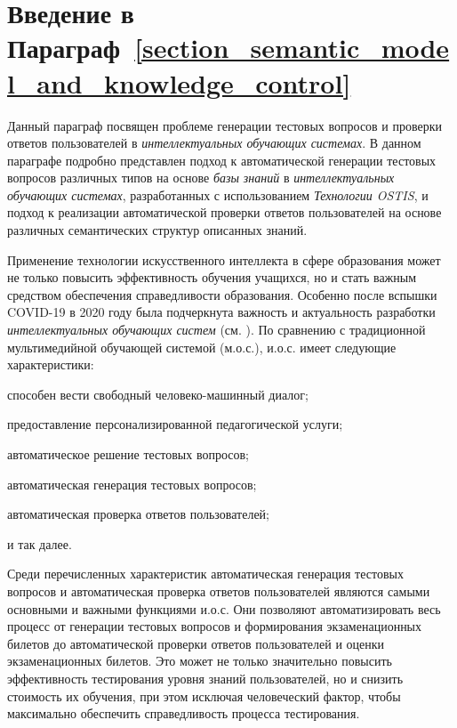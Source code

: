 \section*{Введение в Параграф~\ref{section_semantic_model_and_knowledge_control}}
Данный параграф посвящен проблеме генерации тестовых вопросов и проверки ответов пользователей в \textit{интеллектуальных обучающих системах}. В данном параграфе подробно представлен подход к автоматической генерации тестовых вопросов различных типов на основе \textit{базы знаний} в \textit{интеллектуальных обучающих системах}, разработанных с использованием \textit{Технологии OSTIS}, и подход к реализации автоматической проверки ответов пользователей на основе различных семантических структур описанных знаний.

Применение технологии искусственного интеллекта в сфере образования может не только повысить эффективность обучения учащихся, но и стать важным средством обеспечения справедливости образования. Особенно после вспышки COVID-19 в 2020 году была подчеркнута важность и актуальность разработки \textit{интеллектуальных обучающих систем} (см. ). По сравнению с традиционной мультимедийной обучающей системой (м.о.с.), и.о.с. имеет следующие характеристики:

\begin{textitemize}
	\item способен вести свободный человеко-машинный диалог;
	\item предоставление персонализированной педагогической услуги;
	\item автоматическое решение тестовых вопросов;
	\item автоматическая генерация тестовых вопросов;
	\item автоматическая проверка ответов пользователей;
	\item и так далее.
\end{textitemize}

Среди перечисленных характеристик автоматическая генерация тестовых вопросов и автоматическая проверка ответов пользователей являются самыми основными и важными функциями и.о.с. Они позволяют автоматизировать весь процесс от генерации тестовых вопросов и формирования экзаменационных билетов до автоматической проверки ответов пользователей и оценки экзаменационных билетов. Это может не только значительно повысить эффективность тестирования уровня знаний пользователей, но и снизить стоимость их обучения, при этом исключая человеческий фактор, чтобы максимально обеспечить справедливость процесса тестирования.


